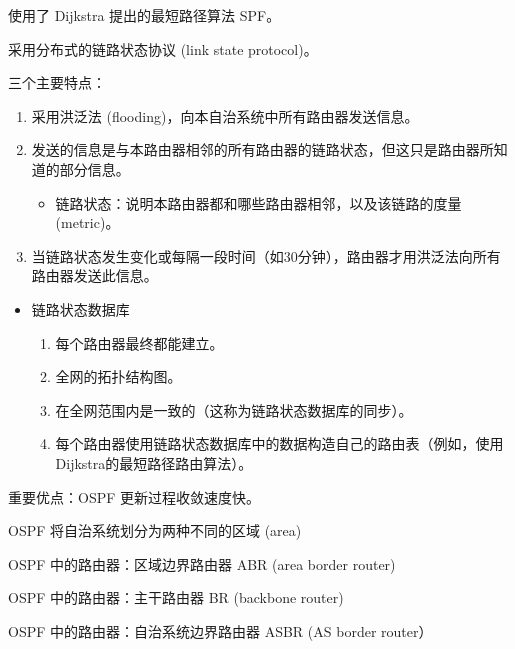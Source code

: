 \documentclass[11pt]{article}
\begin{document}
\begin{enumerate}
\begin{enumerate}
使用了 Dijkstra 提出的最短路径算法 SPF。

采用分布式的链路状态协议 (link state protocol)。

三个主要特点：
\begin{enumerate}
\item 采用洪泛法 (flooding)，向本自治系统中所有路由器发送信息。
\item 发送的信息是与本路由器相邻的所有路由器的链路状态，但这只是路由器所知道的部分信息。
\begin{itemize}
\item 链路状态：说明本路由器都和哪些路由器相邻，以及该链路的度量 (metric)。
\end{itemize}
\item 当链路状态发生变化或每隔一段时间（如30分钟），路由器才用洪泛法向所有路由器发送此信息。
\end{enumerate}


\begin{itemize}
\item 链路状态数据库
\begin{enumerate}
\item 每个路由器最终都能建立。
\item 全网的拓扑结构图。
\item 在全网范围内是一致的（这称为链路状态数据库的同步）。
\item 每个路由器使用链路状态数据库中的数据构造自己的路由表（例如，使用Dijkstra的最短路径路由算法）。
\end{enumerate}
\end{itemize}

重要优点：OSPF 更新过程收敛速度快。

OSPF 将自治系统划分为两种不同的区域 (area)

OSPF 中的路由器：区域边界路由器 ABR (area border router)

OSPF 中的路由器：主干路由器 BR (backbone router)

OSPF 中的路由器：自治系统边界路由器 ASBR (AS border router）


\end{enumerate}
\end{enumerate}
\end{document}
